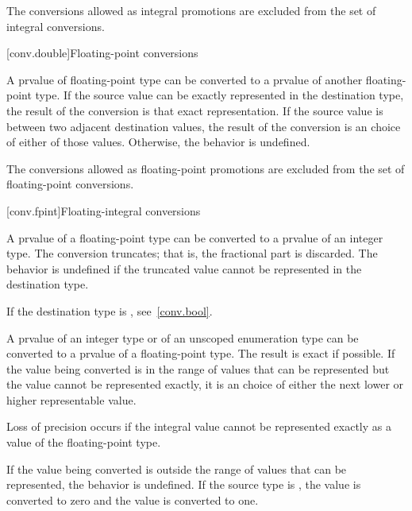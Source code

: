 \pnum
The conversions allowed as integral promotions are excluded from the set
of integral conversions.

[conv.double]{Floating-point conversions}

\pnum
{}%
A prvalue of floating-point type can be converted to a prvalue of
another floating-point type. If the source value can be exactly
represented in the destination type, the result of the conversion is
that exact representation. If the source value is between two adjacent
destination values, the result of the conversion is an
 choice of either of those values.
Otherwise, the behavior is undefined.

\pnum
The conversions allowed as floating-point promotions are excluded from
the set of floating-point conversions.

[conv.fpint]{Floating-integral conversions}

\pnum
{}%
A prvalue of a floating-point type can be converted to a prvalue of an
integer type. The conversion truncates; that is, the fractional part is
discarded.
%
The behavior is undefined if the truncated value cannot be represented
in the destination type.
\begin{note}
If the destination type is , see~\ref{conv.bool}.
\end{note}

\pnum
{}%
%
%
A prvalue of an integer type or of an unscoped enumeration type can be converted to
a prvalue of a floating-point type. The result is exact if possible. If the value being
converted is in the range of values that can be represented but the value cannot be
represented exactly, it is an  choice of either the next lower or higher representable
value.
\begin{note}
Loss of precision occurs if the integral value cannot be represented
exactly as a value of the floating-point type.
\end{note}
If the value being converted is
outside the range of values that can be represented, the behavior is undefined. If the
source type is , the value  is converted to zero and the value
 is converted to one.


